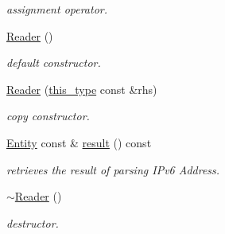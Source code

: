 \begin{DoxyCompactItemize}
\begin{DoxyCompactList}\small\item\em assignment operator. \end{DoxyCompactList}\item 
\hypertarget{classhryky_1_1ip_1_1v6_1_1_reader_a1c973d75c74bec05307bad91b6fa3b20}{\hyperlink{classhryky_1_1ip_1_1v6_1_1_reader_a1c973d75c74bec05307bad91b6fa3b20}{Reader} ()}\label{classhryky_1_1ip_1_1v6_1_1_reader_a1c973d75c74bec05307bad91b6fa3b20}

\begin{DoxyCompactList}\small\item\em default constructor. \end{DoxyCompactList}\item 
\hypertarget{classhryky_1_1ip_1_1v6_1_1_reader_ad9038c2ce0790986b04957964115182c}{\hyperlink{classhryky_1_1ip_1_1v6_1_1_reader_ad9038c2ce0790986b04957964115182c}{Reader} (\hyperlink{classhryky_1_1ip_1_1v6_1_1_reader_a8e77e03500cfbbc0da2b0bc14f30c0d8}{this\-\_\-type} const \&rhs)}\label{classhryky_1_1ip_1_1v6_1_1_reader_ad9038c2ce0790986b04957964115182c}

\begin{DoxyCompactList}\small\item\em copy constructor. \end{DoxyCompactList}\item 
\hypertarget{classhryky_1_1ip_1_1v6_1_1_reader_a9cf66c45db1cc9d4495379ea9a7a72fb}{\hyperlink{classhryky_1_1ip_1_1v6_1_1_entity}{Entity} const \& \hyperlink{classhryky_1_1ip_1_1v6_1_1_reader_a9cf66c45db1cc9d4495379ea9a7a72fb}{result} () const }\label{classhryky_1_1ip_1_1v6_1_1_reader_a9cf66c45db1cc9d4495379ea9a7a72fb}

\begin{DoxyCompactList}\small\item\em retrieves the result of parsing I\-Pv6 Address. \end{DoxyCompactList}\item 
\hypertarget{classhryky_1_1ip_1_1v6_1_1_reader_a2036b1d4549f8354254d59b648449a92}{\hyperlink{classhryky_1_1ip_1_1v6_1_1_reader_a2036b1d4549f8354254d59b648449a92}{$\sim$\-Reader} ()}\label{classhryky_1_1ip_1_1v6_1_1_reader_a2036b1d4549f8354254d59b648449a92}

\begin{DoxyCompactList}\small\item\em destructor. \end{DoxyCompactList}\end{DoxyCompactItemize}
